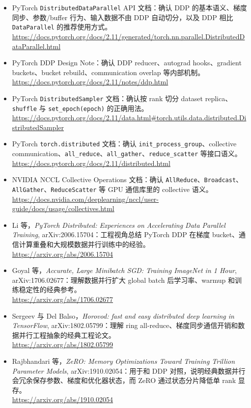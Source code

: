 \begingroup
\small
\sloppy
\begin{itemize}[leftmargin=1.5em]
  \item PyTorch \texttt{DistributedDataParallel} API 文档：确认 DDP 的基本语义、梯度同步、参数/buffer 行为、输入数据不由 DDP 自动切分，以及 DDP 相比 \texttt{DataParallel} 的推荐使用方式。\\
  \url{https://docs.pytorch.org/docs/2.11/generated/torch.nn.parallel.DistributedDataParallel.html}
  \item PyTorch DDP Design Note：确认 DDP reducer、autograd hooks、gradient buckets、bucket rebuild、communication overlap 等内部机制。\\
  \url{https://docs.pytorch.org/docs/2.11/notes/ddp.html}
  \item PyTorch \texttt{DistributedSampler} 文档：确认按 rank 切分 dataset replica、\texttt{shuffle} 与 \texttt{set\_epoch(epoch)} 的正确用法。\\
  \url{https://docs.pytorch.org/docs/2.11/data.html#torch.utils.data.distributed.DistributedSampler}
  \item PyTorch \texttt{torch.distributed} 文档：确认 \texttt{init\_process\_group}、collective communication、\texttt{all\_reduce}、\texttt{all\_gather}、\texttt{reduce\_scatter} 等接口语义。\\
  \url{https://docs.pytorch.org/docs/2.11/distributed.html}
  \item NVIDIA NCCL Collective Operations 文档：确认 \texttt{AllReduce}、\texttt{Broadcast}、\texttt{AllGather}、\texttt{ReduceScatter} 等 GPU 通信库里的 collective 语义。\\
  \url{https://docs.nvidia.com/deeplearning/nccl/user-guide/docs/usage/collectives.html}
  \item Li 等，\emph{PyTorch Distributed: Experiences on Accelerating Data Parallel Training}, arXiv:2006.15704：工程视角总结 PyTorch DDP 在梯度 bucket、通信计算重叠和大规模数据并行训练中的经验。\\
  \url{https://arxiv.org/abs/2006.15704}
  \item Goyal 等，\emph{Accurate, Large Minibatch SGD: Training ImageNet in 1 Hour}, arXiv:1706.02677：理解数据并行扩大 global batch 后学习率、warmup 和训练稳定性的经典参考。\\
  \url{https://arxiv.org/abs/1706.02677}
  \item Sergeev 与 Del Balso，\emph{Horovod: fast and easy distributed deep learning in TensorFlow}, arXiv:1802.05799：理解 ring all-reduce、梯度同步通信开销和数据并行工程抽象的经典工程论文。\\
  \url{https://arxiv.org/abs/1802.05799}
  \item Rajbhandari 等，\emph{ZeRO: Memory Optimizations Toward Training Trillion Parameter Models}, arXiv:1910.02054：用于和 DDP 对照，说明经典数据并行会冗余保存参数、梯度和优化器状态，而 ZeRO 通过状态分片降低单 rank 显存。\\
  \url{https://arxiv.org/abs/1910.02054}
\end{itemize}
\endgroup
